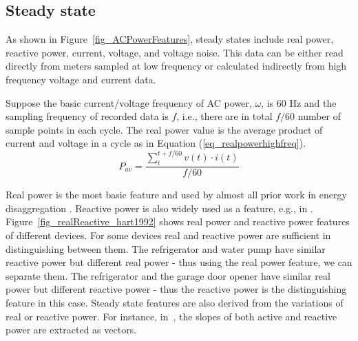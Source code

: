\subsection*{Steady state}
\iffalse
\huijuanc{comment out until huijuan's next comment}
As shown in Figure~\ref{fig_ACPowerFeatures}, 
steady states include real and reactive power from both 
low frequency and high frequency data, 
current or voltage from high frequency data, 
and voltage noise. \manishc{figure 11 doesn't show anything about high/low frequency} 
\huijuanc{agree. rewritten as follows.}
\fi
As shown in Figure~\ref{fig_ACPowerFeatures}, 
steady states include real power, reactive power, 
current, voltage, 
and voltage noise. 
This data can be either read directly from meters
sampled at low frequency or calculated indirectly from 
high frequency voltage and current data. 
\iffalse
\manishc{in this sentence, are
  you saying the meters that sample at low frequency compute the real/reactive
  power, while the meters that sample at high frequency do not?} 
  \huijuanc{Yes, this is what I mean. Is it correct?}
\fi  
Suppose the basic current/voltage frequency of
AC power, $\omega$, is 60 Hz
and the sampling frequency of recorded data is $f$,
i.e., there are in total $f/60$ number of sample points in
each cycle.
The real power value is the average product
of current and voltage in a cycle as in Equation (\ref{eq_realpowerhighfreq}). 
\begin{equation}
P_{av}= \frac{\sum_{t}^{t+f/60} v(t) \cdot i(t)}{f/60}
\label{eq_realpowerhighfreq}
\end{equation}

Real power is the most basic feature and used 
by almost all prior work in energy disaggregation \cite{hart1992,powers1991using,farinaccio1999using,marceau2000nonintrusive,baranski2004genetic,baranski2004detecting}.
Reactive power is also widely used as a feature, e.g., in \cite{hart1992,laughman2003power,drenker1999nonintrusive}.
Figure~\ref{fig_realReactive_hart1992} shows real power and 
reactive power features of different devices. 
For some devices real and reactive power are sufficient in distinguishing
between them. 
The refrigerator and water pump have similar reactive power but
different real power - thus using the real power feature, we can separate them. 
The refrigerator and the garage door opener have similar real power but different reactive power - 
thus the reactive power is the distinguishing feature in this case.
Steady state features are also derived from the variations of real or reactive power.
For instance, in~\cite{milioudis2013event}, 
the slopes of both active and reactive power 
are extracted as vectors. %


